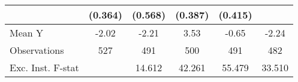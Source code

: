 {\begin{tabular}{l*{5}{c}}
            &     (0.364)         &     (0.568)         &     (0.387)         &     (0.415)         &                     \\
\midrule
Mean Y      &       -2.02         &       -2.21         &        3.53         &       -0.65         &       -2.24         \\
Observations&         527         &         491         &         500         &         491         &         482         \\
Exc. Inst. F-stat&                     &      14.612         &      42.261         &      55.479         &      33.510         \\
\bottomrule
\end{tabular}
}
